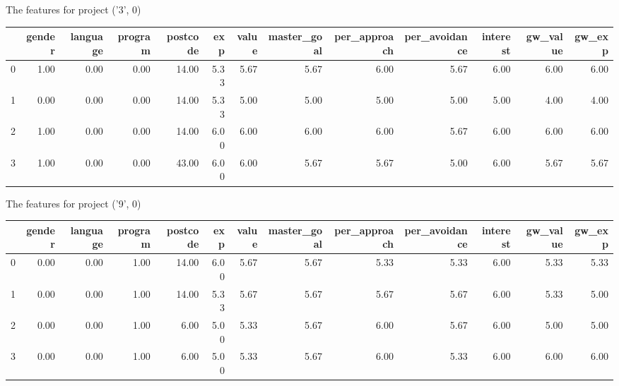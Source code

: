 \documentclass[7pt]{article}
\begin{document}
\begin{landscape}
The features for project ('3', 0)\newline
\begin{tabular}{lrrrrrrrrrrrr}
\toprule
{} &  gender &  language &  program &  postcode &  exp &  value &  master\_goal &  per\_approach &  per\_avoidance &  interest &  gw\_value &  gw\_exp \\
\midrule
0 &    1.00 &      0.00 &     0.00 &     14.00 & 5.33 &   5.67 &         5.67 &          6.00 &           5.67 &      6.00 &             6.00 &           6.00 \\
1 &    0.00 &      0.00 &     0.00 &     14.00 & 5.33 &   5.00 &         5.00 &          5.00 &           5.00 &      5.00 &             4.00 &           4.00 \\
2 &    1.00 &      0.00 &     0.00 &     14.00 & 6.00 &   6.00 &         6.00 &          6.00 &           5.67 &      6.00 &             6.00 &           6.00 \\
3 &    1.00 &      0.00 &     0.00 &     43.00 & 6.00 &   6.00 &         5.67 &          5.67 &           5.00 &      6.00 &             5.67 &           5.67 \\
\bottomrule
\end{tabular}

The features for project ('9', 0)\newline
\begin{tabular}{lrrrrrrrrrrrr}
\toprule
{} &  gender &  language &  program &  postcode &  exp &  value &  master\_goal &  per\_approach &  per\_avoidance &  interest &  gw\_value &  gw\_exp \\
\midrule
0 &    0.00 &      0.00 &     1.00 &     14.00 & 6.00 &   5.67 &         5.67 &          5.33 &           5.33 &      6.00 &             5.33 &           5.33 \\
1 &    0.00 &      0.00 &     1.00 &     14.00 & 5.33 &   5.67 &         5.67 &          5.67 &           5.67 &      6.00 &             5.33 &           5.00 \\
2 &    0.00 &      0.00 &     1.00 &      6.00 & 5.00 &   5.33 &         5.67 &          6.00 &           5.67 &      6.00 &             5.00 &           5.00 \\
3 &    0.00 &      0.00 &     1.00 &      6.00 & 5.00 &   5.33 &         5.67 &          6.00 &           5.33 &      6.00 &             6.00 &           6.00 \\
\bottomrule
\end{tabular}


\end{landscape}
\end{document}
